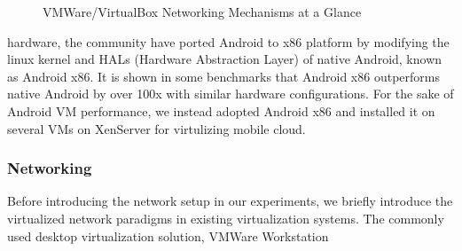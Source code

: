 \documentclass[journal,comsoc]{IEEEtran}
\begin{document}
\begin{figure}
  \centering
  \caption{VMWare/VirtualBox Networking Mechanisms at a Glance}
  \label{vmware_net} %
\end{figure}

\noindent hardware, the community have ported Android to x86 platform by modifying the linux kernel and HALs (Hardware Abstraction Layer) of native Android, known as Android x86\cite{android-x86}. It is shown in some benchmarks that Android x86 outperforms native Android by over 100x with similar hardware configurations\cite{android_x86_bench}. For the sake of Android VM performance, we instead adopted Android x86 and installed it on several VMs on XenServer for virtulizing mobile cloud.

\subsubsection{Networking}
Before introducing the network setup in our experiments, we briefly introduce the virtualized network paradigms in existing virtualization systems. The commonly used desktop virtualization solution, VMWare Workstation\cite{vmworkstation} 
\end{document}
